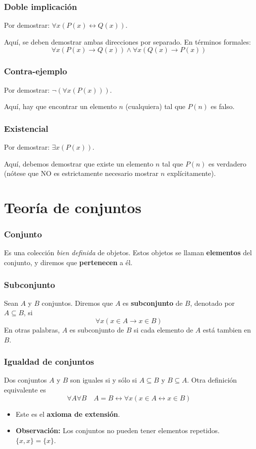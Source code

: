 \begin{multicols}{2}
    \subsubsection*{Doble implicación}
    Por demostrar: $\forall x (P(x) \leftrightarrow Q(x))$. \p
    
    Aquí, se deben demostrar ambas direcciones por separado. En términos formales:
    $$
    \forall x(P(x) \rightarrow Q(x)) \wedge \forall x(Q(x) \rightarrow P(x))
    $$
    
    \subsubsection*{Contra-ejemplo}
    Por demostrar: $\neg (\forall x(P(x)))$. \p
    
    Aquí, hay que encontrar un elemento $n$ (cualquiera) tal que $P(n)$ es falso.
    
    \subsubsection*{Existencial}
    Por demostrar: $\exists x (P(x))$.\p
    
    Aquí, debemos demostrar que existe un elemento $n$ tal que $P(n)$ es verdadero (nótese que NO es estrictamente necesario mostrar $n$ explícitamente).
    
    \section{Teoría de conjuntos}
    \subsubsection*{Conjunto}
    Es una colección \textit{bien definida} de objetos. Estos objetos se llaman \textbf{elementos} del conjunto, y diremos que \textbf{pertenecen} a él.
    
    \subsubsection*{Subconjunto}
    Sean $A$ y $B$ conjuntos. Diremos que $A$ es \textbf{subconjunto} de $B$, denotado por $A \subseteq B$, si
    $$
    \forall x (x \in A \rightarrow x \in B)
    $$
    En otras palabras, $A$ es subconjunto de $B$ si cada elemento de $A$ está tambien en $B$.
    
    \subsubsection*{Igualdad de conjuntos}
    Dos conjuntos $A$ y $B$ son iguales si y sólo si $A \subseteq B$ y $B \subseteq A$. Otra definición equivalente es
    $$
    \forall A \forall B \quad A = B \leftrightarrow \forall x (x \in A \leftrightarrow x \in B)
    $$
    \begin{itemize}
        \item Este es el \textbf{axioma de extensión}.
        \item \textbf{Observación:} Los conjuntos no pueden tener elementos repetidos. $\{x,x\} = \{x\}$.
    \end{itemize}
    

\end{multicols}
